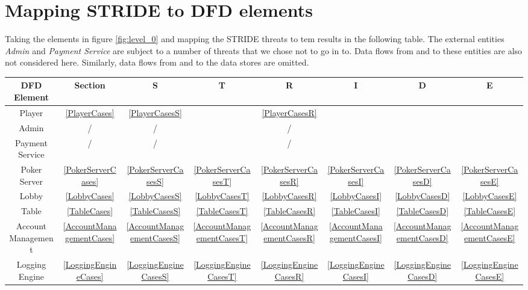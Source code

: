\documentclass[a4paper,11pt]{report}
\begin{document}
\section{Mapping STRIDE to DFD elements}

Taking the elements in figure \ref{fig:level_0} and mapping the STRIDE threats to tem results in the following table. The external entities \textit{Admin} and \textit{Payment Service} are subject to a number of threats that we chose not to go in to. Data flows from and to these entities are also not considered here. Similarly, data flows from and to the data stores are omitted.

\vspace{0.3cm}
\begin{center}
\begin{tabular}{| c || c || c | c | c | c | c | c |}
  \hline
  \textbf{DFD Element} 	& \textbf{Section}		& \textbf{S} 	& \textbf{T} 	& \textbf{R} 	& \textbf{I} 	& \textbf{D} 	& \textbf{E}	\\\hline
  \hline
  Player 		& \ref{PlayerCases}		& \ref{PlayerCasesS} 	& 	& \ref{PlayerCasesR} 		&  		&  		& 		\\\hline
  Admin 		& /			& / 		& 		& / 		&  		&  		& 		\\\hline
  Payment Service 	& /			& / 		& 		& / 		&  		&  		& 		\\\hline
  \hline
  Poker Server 		& \ref{PokerServerCases}	& \ref{PokerServerCasesS} 	& \ref{PokerServerCasesT}	& \ref{PokerServerCasesR} 	& \ref{PokerServerCasesI} 	& \ref{PokerServerCasesD} 	& \ref{PokerServerCasesE}	\\\hline
  Lobby 		& \ref{LobbyCases}		& \ref{LobbyCasesS} 	& \ref{LobbyCasesT}	& \ref{LobbyCasesR} 	& \ref{LobbyCasesI} 	& \ref{LobbyCasesD} 	& \ref{LobbyCasesE}	\\\hline
  Table 		& \ref{TableCases}		& \ref{TableCasesS} 	& \ref{TableCasesT}	& \ref{TableCasesR} 	& \ref{TableCasesI} 	& \ref{TableCasesD} 	& \ref{TableCasesE}	\\\hline
  Account Management 	& \ref{AccountManagementCases} 	& \ref{AccountManagementCasesS} 	& \ref{AccountManagementCasesT}	& \ref{AccountManagementCasesR} 	& \ref{AccountManagementCasesI} 	& \ref{AccountManagementCasesD} 	& \ref{AccountManagementCasesE}	\\\hline
  Logging Engine 	& \ref{LoggingEngineCases}	& \ref{LoggingEngineCasesS} 	& \ref{LoggingEngineCasesT}	& \ref{LoggingEngineCasesR} 	& \ref{LoggingEngineCasesI} 	& \ref{LoggingEngineCasesD} 	& \ref{LoggingEngineCasesE}	\\\hline

\end{tabular}
\end{center}
\end{document}

